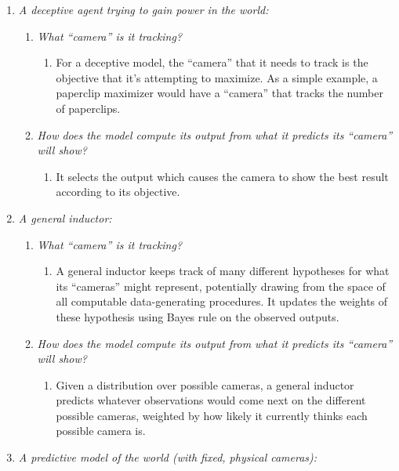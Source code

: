 \documentclass[
  onecolumn,
  nonatbib,
]{miri-tech-article}
\begin{document}
\begin{enumerate}
\begin{enumerate}
\begin{enumerate}
        \end{enumerate}
    \end{enumerate}
\item \textit{A deceptive agent trying to gain power in the world:}
    \begin{enumerate}
    \item \textit{What ``camera'' is it tracking?}
        \begin{enumerate}
        \item For a deceptive model, the ``camera'' that it needs to track is the objective that it's attempting to maximize. As a simple example, a paperclip maximizer would have a ``camera'' that tracks the number of paperclips.
        \end{enumerate}
    \item \textit{How does the model compute its output from what it predicts its ``camera'' will show?}
        \begin{enumerate}
        \item It selects the output which causes the camera to show the best result according to its objective.
        \end{enumerate}
    \end{enumerate}
\item \textit{A general inductor:}
    \begin{enumerate}
    \item \textit{What ``camera'' is it tracking?}
        \begin{enumerate}
        \item A general inductor keeps track of many different hypotheses for what its ``cameras'' might represent, potentially drawing from the space of all computable data-generating procedures. It updates the weights of these hypothesis using Bayes rule on the observed outputs.
        \end{enumerate}
    \item \textit{How does the model compute its output from what it predicts its ``camera'' will show?}
        \begin{enumerate}
        \item Given a distribution over possible cameras, a general inductor predicts whatever observations would come next on the different possible cameras, weighted by how likely it currently thinks each possible camera is.
        \end{enumerate}
    \end{enumerate}
\item \textit{A predictive model of the world (with fixed, physical cameras):}

\end{enumerate}
\end{document}
